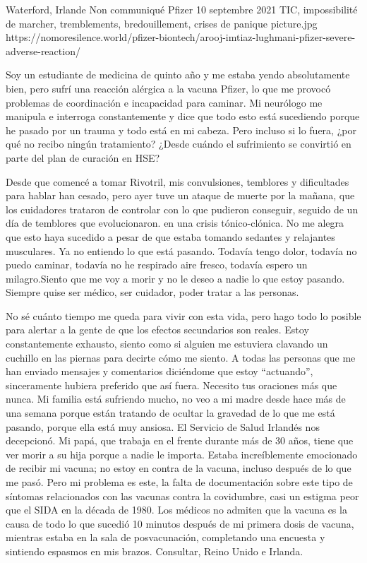           {Waterford, Irlande}
          {Non communiqué}
          {Pfizer}
          {10 septembre 2021}
          {TIC, impossibilité de marcher, tremblements, bredouillement, crises de panique}
          {picture.jpg}
          {https://nomoresilence.world/pfizer-biontech/arooj-imtiaz-lughmani-pfizer-severe-adverse-reaction/}
          {

Soy un estudiante de medicina de quinto año y me estaba yendo absolutamente
bien, pero sufrí una reacción alérgica a la vacuna Pfizer, lo que me provocó
problemas de coordinación e incapacidad para caminar. Mi neurólogo me manipula e
interroga constantemente y dice que todo esto está sucediendo porque he pasado
por un trauma y todo está en mi cabeza. Pero incluso si lo fuera, ¿por qué no
recibo ningún tratamiento? ¿Desde cuándo el sufrimiento se convirtió en parte
del plan de curación en HSE?

Desde que comencé a tomar Rivotril, mis convulsiones, temblores y dificultades
para hablar han cesado, pero ayer tuve un ataque de muerte por la mañana, que
los cuidadores trataron de controlar con lo que pudieron conseguir, seguido de
un día de temblores que evolucionaron. en una crisis tónico-clónica. No me
alegra que esto haya sucedido a pesar de que estaba tomando sedantes y
relajantes musculares. Ya no entiendo lo que está pasando. Todavía tengo dolor,
todavía no puedo caminar, todavía no he respirado aire fresco, todavía espero un
milagro.Siento que me voy a morir y no le deseo a nadie lo que estoy
pasando. Siempre quise ser médico, ser cuidador, poder tratar a las personas.

No sé cuánto tiempo me queda para vivir con esta vida, pero hago todo lo posible
para alertar a la gente de que los efectos secundarios son reales. Estoy
constantemente exhausto, siento como si alguien me estuviera clavando un
cuchillo en las piernas para decirte cómo me siento. A todas las personas que me
han enviado mensajes y comentarios diciéndome que estoy “actuando”, sinceramente
hubiera preferido que así fuera. Necesito tus oraciones más que nunca. Mi
familia está sufriendo mucho, no veo a mi madre desde hace más de una semana
porque están tratando de ocultar la gravedad de lo que me está pasando, porque
ella está muy ansiosa. El Servicio de Salud Irlandés nos decepcionó. Mi papá,
que trabaja en el frente durante más de 30 años, tiene que ver morir a su hija
porque a nadie le importa. Estaba increíblemente emocionado de recibir mi
vacuna; no estoy en contra de la vacuna, incluso después de lo que me pasó. Pero
mi problema es este, la falta de documentación sobre este tipo de síntomas
relacionados con las vacunas contra la covidumbre, casi un estigma peor que el
SIDA en la década de 1980. Los médicos no admiten que la vacuna es la causa de
todo lo que sucedió 10 minutos después de mi primera dosis de vacuna, mientras
estaba en la sala de posvacunación, completando una encuesta y sintiendo
espasmos en mis brazos. Consultar, Reino Unido e Irlanda.

}
